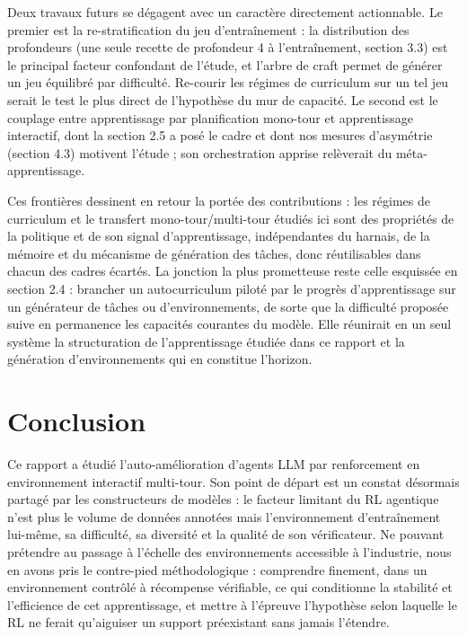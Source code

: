 \documentclass[11pt,a4paper]{article}
\begin{document}
Deux travaux futurs se dégagent avec un caractère directement actionnable. Le premier est la re-stratification du jeu d'entraînement : la distribution des profondeurs (une seule recette de profondeur 4 à l'entraînement, section 3.3) est le principal facteur confondant de l'étude, et l'arbre de craft permet de générer un jeu équilibré par difficulté. Re-courir les régimes de curriculum sur un tel jeu serait le test le plus direct de l'hypothèse du mur de capacité. Le second est le couplage entre apprentissage par planification mono-tour et apprentissage interactif, dont la section 2.5 a posé le cadre et dont nos mesures d'asymétrie (section 4.3) motivent l'étude ; son orchestration apprise relèverait du méta-apprentissage.

Ces frontières dessinent en retour la portée des contributions : les régimes de curriculum et le transfert mono-tour/multi-tour étudiés ici sont des propriétés de la politique et de son signal d'apprentissage, indépendantes du harnais, de la mémoire et du mécanisme de génération des tâches, donc réutilisables dans chacun des cadres écartés. La jonction la plus prometteuse reste celle esquissée en section 2.4 : brancher un autocurriculum piloté par le progrès d'apprentissage sur un générateur de tâches ou d'environnements, de sorte que la difficulté proposée suive en permanence les capacités courantes du modèle. Elle réunirait en un seul système la structuration de l'apprentissage étudiée dans ce rapport et la génération d'environnements qui en constitue l'horizon.

\newpage
\section{Conclusion}

Ce rapport a étudié l'auto-amélioration d'agents LLM par renforcement en environnement interactif multi-tour. Son point de départ est un constat désormais partagé par les constructeurs de modèles : le facteur limitant du RL agentique n'est plus le volume de données annotées mais l'environnement d'entraînement lui-même, sa difficulté, sa diversité et la qualité de son vérificateur. Ne pouvant prétendre au passage à l'échelle des environnements accessible à l'industrie, nous en avons pris le contre-pied méthodologique : comprendre finement, dans un environnement contrôlé à récompense vérifiable, ce qui conditionne la stabilité et l'efficience de cet apprentissage, et mettre à l'épreuve l'hypothèse selon laquelle le RL ne ferait qu'aiguiser un support préexistant sans jamais l'étendre.
\end{document}
